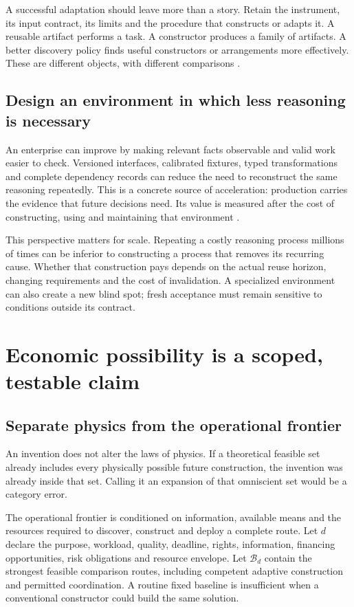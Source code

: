 \documentclass[11pt,letterpaper]{article}
\begin{document}
A successful adaptation should leave more than a story. Retain the instrument, its input contract, its limits and the procedure that constructs or adapts it. A reusable artifact performs a task. A constructor produces a family of artifacts. A better discovery policy finds useful constructors or arrangements more effectively. These are different objects, with different comparisons \cite{outevolve,flywheel11}.

\subsection{Design an environment in which less reasoning is necessary}
An enterprise can improve by making relevant facts observable and valid work easier to check. Versioned interfaces, calibrated fixtures, typed transformations and complete dependency records can reduce the need to reconstruct the same reasoning repeatedly. This is a concrete source of acceleration: production carries the evidence that future decisions need. Its value is measured after the cost of constructing, using and maintaining that environment \cite{world,outthink,outreflect,outaccelerate}.

This perspective matters for scale. Repeating a costly reasoning process millions of times can be inferior to constructing a process that removes its recurring cause. Whether that construction pays depends on the actual reuse horizon, changing requirements and the cost of invalidation. A specialized environment can also create a new blind spot; fresh acceptance must remain sensitive to conditions outside its contract.

\section{Economic possibility is a scoped, testable claim}
\subsection{Separate physics from the operational frontier}
An invention does not alter the laws of physics. If a theoretical feasible set already includes every physically possible future construction, the invention was already inside that set. Calling it an expansion of that omniscient set would be a category error.

The operational frontier is conditioned on information, available means and the resources required to discover, construct and deploy a complete route. Let $d$ declare the purpose, workload, quality, deadline, rights, information, financing opportunities, risk obligations and resource envelope. Let $\mathcal B_d$ contain the strongest feasible comparison routes, including competent adaptive construction and permitted coordination. A routine fixed baseline is insufficient when a conventional constructor could build the same solution.
\end{document}
